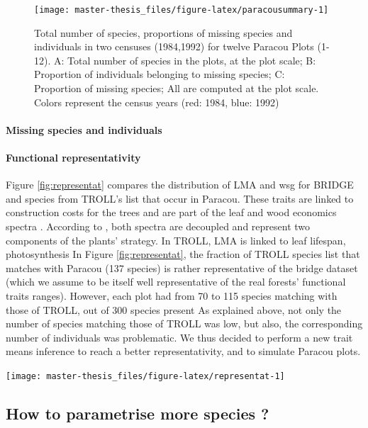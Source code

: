 \documentclass[12pt,]{article}
\theoremstyle{definition}
\theoremstyle{definition}
\theoremstyle{definition}
\theoremstyle{remark}
\begin{document}
\begin{figure}
\texttt{[image: master-thesis\_files/figure-latex/paracousummary-1]} \caption{ Total number of species, proportions of missing species and individuals in two censuses (1984,1992) for twelve Paracou Plots (1-12). A: Total number of species in the plots, at the plot scale; B: Proportion of individuals belonging to missing species; C: Proportion of missing species; All are computed at the plot scale. Colors represent the census years (red: 1984, blue: 1992)}\label{fig:paracousummary}
\end{figure}

\paragraph{Missing species and
individuals}\label{missing-species-and-individuals}

\paragraph{Functional
representativity}\label{functional-representativity}

Figure \ref{fig:representat} compares the distribution of LMA and wsg
for BRIDGE and species from TROLL's list that occur in Paracou. These
traits are linked to construction costs for the trees and are part of
the leaf and wood economics spectra \citep{Wright2004, Chave2009}.
According to \citet{Baraloto2010}, both spectra are decoupled and
represent two components of the plants' strategy. In TROLL, LMA is
linked to leaf lifespan, photosynthesis In Figure \ref{fig:representat},
the fraction of TROLL species list that matches with Paracou (137
species) is rather representative of the bridge dataset (which we assume
to be itself well representative of the real forests' functional traits
ranges). However, each plot had from 70 to 115 species matching with
those of TROLL, out of 300 species present As explained above, not only
the number of species matching those of TROLL was low, but also, the
corresponding number of individuals was problematic. We thus decided to
perform a new trait means inference to reach a better representativity,
and to simulate Paracou plots.

\texttt{[image: master-thesis\_files/figure-latex/representat-1]}

\subsection{How to parametrise more species
?}\label{how-to-parametrise-more-species}
\end{document}
